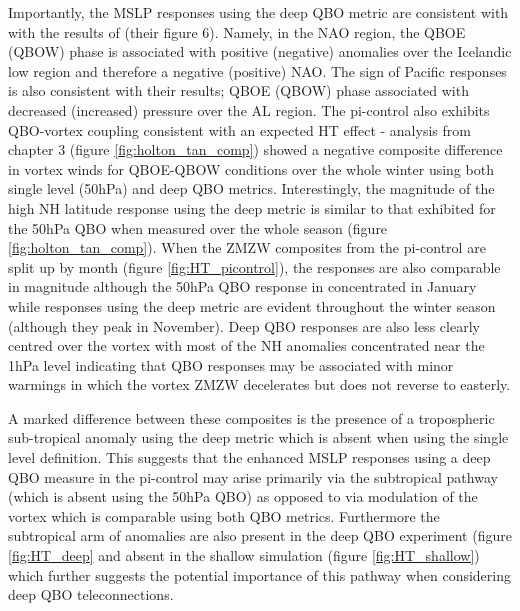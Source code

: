 Importantly, the MSLP responses using the deep QBO metric are consistent with with the results of \cite{andrewsObserved2019d} (their figure 6). Namely, in the NAO region, the QBOE (QBOW) phase is associated with positive (negative) anomalies over the Icelandic low region and therefore a negative (positive) NAO. The sign of Pacific responses is also consistent with their results; QBOE (QBOW) phase associated with decreased (increased) pressure over the AL region. The pi-control also exhibits QBO-vortex coupling consistent with an expected HT effect - analysis from chapter 3 (figure \ref{fig:holton_tan_comp}) showed a negative composite difference in vortex winds for QBOE-QBOW conditions over the whole winter using both single level (50hPa) and deep QBO metrics. Interestingly, the magnitude of the high NH latitude response using the deep metric is similar to that exhibited for the 50hPa QBO when measured over the whole season (figure \ref{fig:holton_tan_comp}). When the ZMZW composites from the pi-control are split up by month (figure \ref{fig:HT_picontrol}), the responses are also comparable in magnitude although the 50hPa QBO response in concentrated in January while responses using the deep metric are evident throughout the winter season (although they peak in November). Deep QBO responses are also less clearly centred over the vortex with most of the NH anomalies concentrated near the 1hPa level indicating that QBO responses may be associated with minor warmings in which the vortex ZMZW decelerates but does not reverse to easterly. 

A marked difference between these composites is the presence of a tropospheric sub-tropical anomaly using the deep metric which is absent when using the single level definition. This suggests that the enhanced MSLP responses using a deep QBO measure in the pi-control may arise primarily via the subtropical pathway (which is absent using the 50hPa QBO) as opposed to via modulation of the vortex which is comparable using both QBO metrics. Furthermore the subtropical arm of anomalies are also present in the deep QBO experiment (figure \ref{fig:HT_deep} and absent in the shallow simulation (figure \ref{fig:HT_shallow}) which further suggests the potential importance of this pathway when considering deep QBO teleconnections.

